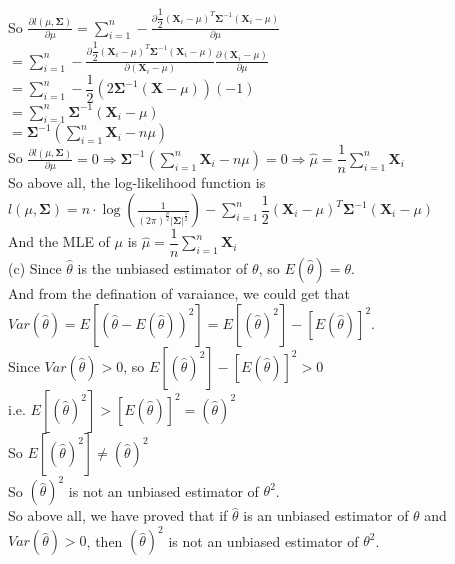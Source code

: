 \documentclass[10pt]{article}
\begin{document}
\begin{enumerate}[1.]
So $\frac{\partial l(\mu,\mathbf{\Sigma})}{\partial \mu}=\sum\limits_{i=1}^n-\frac{\partial \dfrac{1}{2}(\mathbf{X}_i-\mu)^T\mathbf{\Sigma}^{-1}(\mathbf{X}_i-\mu)}{\partial \mu}$\\
$=\sum\limits_{i=1}^n-\frac{\partial \dfrac{1}{2}(\mathbf{X}_i-\mu)^T\mathbf{\Sigma}^{-1}(\mathbf{X}_i-\mu)}{\partial (\mathbf{X}_i-\mu)}\frac{\partial (\mathbf{X}_i-\mu)}{\partial \mu}$\\
$=\sum\limits_{i=1}^n-\dfrac{1}{2}(2\mathbf{\Sigma}^{-1}(\mathbf{X}-\mu))(-1)$\\
$=\sum\limits_{i=1}^n\mathbf{\Sigma}^{-1}(\mathbf{X}_i-\mu)$\\
$=\mathbf{\Sigma}^{-1}(\sum\limits_{i=1}^n\mathbf{X}_i-n\mu)$\\

So $\frac{\partial l(\mu,\mathbf{\Sigma})}{\partial \mu}=0\Rightarrow \mathbf{\Sigma}^{-1}(\sum\limits_{i=1}^n\mathbf{X}_i-n\mu)=0\Rightarrow\hat{\mu}=\dfrac{1}{n}\sum\limits_{i=1}^n\mathbf{X}_i$\\

So above all, the log-likelihood function is $l(\mu,\mathbf{\Sigma})=n\cdot\log(\frac{1}{(2\pi)^\frac{p}{2}|\mathbf{\Sigma}|^{\frac{1}{2}}})-\sum\limits_{i=1}^n\dfrac{1}{2}(\mathbf{X}_i-\mu)^T\mathbf{\Sigma}^{-1}(\mathbf{X}_i-\mu)$\\
And the MLE of $\mu$ is $\hat{\mu}=\dfrac{1}{n}\sum\limits_{i=1}^n\mathbf{X}_i$\\

(c) Since $\hat{\theta}$ is the unbiased estimator of $\theta$, so $E(\hat{\theta})=\theta$.\\
And from the defination of varaiance, we could get that $Var(\hat{\theta})=E[(\hat{\theta}-E(\hat{\theta}))^2]=E[(\hat{\theta})^2]-[E(\hat{\theta})]^2$.\\
Since $Var(\hat{\theta})>0$, so $E[(\hat{\theta})^2]-[E(\hat{\theta})]^2>0$\\
i.e. $E[(\hat{\theta})^2]>[E(\hat{\theta})]^2=(\hat{\theta})^2$\\
So $E[(\hat{\theta})^2]\neq(\hat{\theta})^2$\\
So $(\hat{\theta})^2$ is not an unbiased estimator of $\theta^2$.\\

So above all, we have proved that if $\hat{\theta}$ is an unbiased estimator of $\theta$ and $Var(\hat{\theta})>0$, then $(\hat{\theta})^2$ is not an unbiased estimator of $\theta^2$.\\




\end{enumerate}
\end{document}
